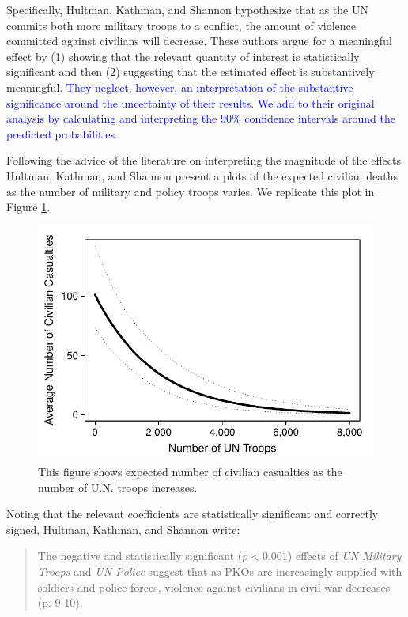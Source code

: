 \documentclass[12pt]{article}
\newcommand{\kelly}[1]{\textcolor{blue}{#1}}
\begin{document}
Specifically, Hultman, Kathman, and Shannon hypothesize that as the UN commits both more military troops to a conflict, the amount of violence committed against civilians will decrease. These authors argue for a meaningful effect by (1) showing that the relevant quantity of interest is statistically significant and then (2) suggesting that the estimated effect is substantively meaningful. \kelly{They neglect, however, an interpretation of the substantive significance around the uncertainty of their results. We add to their original analysis by calculating and interpreting the 90\% confidence intervals around the predicted probabilities.}

Following the advice of the literature on interpreting the magnitude of the effects Hultman, Kathman, and Shannon present a plots of the expected civilian deaths as the number of military and policy troops varies. We replicate this plot in Figure \ref{fig:hks-ev}.

\begin{figure}[H]
\begin{center}
\includegraphics[scale = .8]{figs/hks-ev.pdf}
\caption{This figure shows expected number of civilian casualties as the number of U.N. troops increases.}\label{fig:hks-ev}
\end{center}
\end{figure}

Noting that the relevant coefficients are statistically significant and correctly signed, Hultman, Kathman, and Shannon write:

\begin{quote}
The negative and statistically significant ($p < 0.001$) effects of \textit{UN Military Troops} and \textit{UN Police} suggest that as PKOs are increasingly supplied with soldiers and police forces, violence against civilians in civil war decreases (p. 9-10).
\end{quote}
\end{document}
